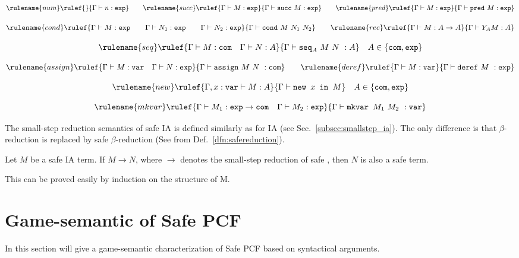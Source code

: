 $$ \rulename{num} \rulef{}{\Gamma \vdash n :\texttt{exp}}
\qquad \rulename{succ} \rulef{\Gamma \vdash M:\texttt{exp} }{\Gamma
\vdash \texttt{succ}\ M:\texttt{exp}} \qquad \rulename{pred}
\rulef{\Gamma \vdash M:\texttt{exp} }{\Gamma \vdash \texttt{pred}\
M:\texttt{exp}}$$

$$
\rulename{cond} \rulef{\Gamma \vdash M : \texttt{exp} \qquad \Gamma
\vdash N_1 : \texttt{exp} \qquad \Gamma \vdash N_2 : \texttt{exp}
}{\Gamma \vdash \texttt{cond}\ M\ N_1\ N_2} \qquad  \rulename{rec}
\rulef{\Gamma \vdash M : A\rightarrow A }{ \Gamma \vdash Y_A M :
A}$$

$$ \rulename{seq} \rulef{\Gamma \vdash M : \texttt{com} \quad \Gamma \vdash N :A}
    {\Gamma \vdash \texttt{seq}_A \ M\ N\ : A} \quad A \in \{ \texttt{com}, \texttt{exp}\}$$

$$ \rulename{assign} \rulef{\Gamma \vdash M : \texttt{var} \quad \Gamma \vdash N : \texttt{exp}}
    {\Gamma \vdash \texttt{assign}\ M\ N\ : \texttt{com}}
\qquad
 \rulename{deref} \rulef{\Gamma \vdash M : \texttt{var}}
    {\Gamma \vdash \texttt{deref}\ M\ : \texttt{exp}}$$

$$ \rulename{new} \rulef{\Gamma, x : \texttt{var} \vdash M : A}
    {\Gamma \vdash \texttt{new } x \texttt{ in } M} \quad A \in \{ \texttt{com}, \texttt{exp}\}$$

$$ \rulename{mkvar} \rulef{\Gamma \vdash M_1 : \texttt{exp} \rightarrow \texttt{com} \quad \Gamma \vdash M_2 : \texttt{exp}}
    {\Gamma \vdash \texttt{mkvar } M_1\ M_2\ : \texttt{var}}$$


The small-step reduction semantics of safe IA is defined similarly as for IA (see Sec.\ \ref{subsec:smallstep_ia}). The only difference is that $\beta$-reduction is replaced by safe $\beta$-reduction (See from Def.\ \ref{dfn:safereduction}).

\begin{lemma}
\label{lem:ia_safety_preserved} Let $M$ be a safe IA term. If
$M \rightarrow N$, where $\rightarrow$ denotes the small-step reduction of safe \ialgol, then $N$ is also a safe term.
\end{lemma}
This can be proved easily by induction on the structure of M.



\section{Game-semantic of Safe PCF}
In this section will give a game-semantic characterization of Safe
PCF based on syntactical arguments.


